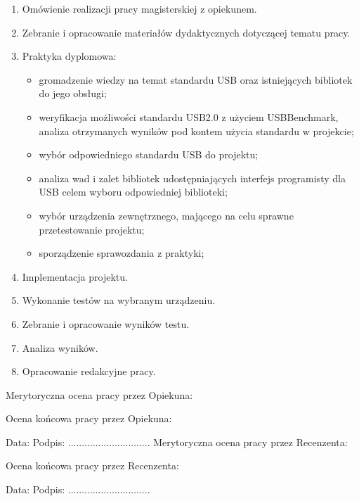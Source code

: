 \documentclass{BscUS}
\newcommand\blankpage{%
    \null
    \thispagestyle{empty}%
    \newpage}
\begin{document}
\begin{enumerate}
\item Omówienie realizacji pracy magisterskiej z opiekunem.
\item Zebranie i opracowanie materiałów dydaktycznych dotyczącej tematu pracy.
\item Praktyka dyplomowa:
\begin{itemize}
\item gromadzenie wiedzy na temat standardu USB oraz istniejących bibliotek do jego obsługi;
\item weryfikacja możliwości standardu USB2.0 z użyciem USBBenchmark, analiza otrzymanych wyników pod kontem użycia standardu w projekcie;
\item wybór odpowiedniego standardu USB do projektu;
\item analiza wad i zalet bibliotek udostępniających interfejs programisty dla USB celem wyboru odpowiedniej biblioteki;
\item wybór urządzenia zewnętrznego, mającego na celu sprawne przetestowanie projektu;
\item sporządzenie sprawozdania z praktyki;
\end{itemize}
\item Implementacja projektu.
\item Wykonanie testów na wybranym urządzeniu.
\item Zebranie i opracowanie wyników testu.
\item Analiza wyników.
\item Opracowanie redakcyjne pracy.
\end{enumerate}
\afterpage{\blankpage}
\newpage
\thispagestyle{plain}
Merytoryczna ocena pracy przez Opiekuna:


Ocena końcowa pracy przez Opiekuna: 

\hspace{2cm} Data: \hspace{6cm}  Podpis: ..............................
\afterpage{\blankpage}
\newpage
\thispagestyle{plain}
Merytoryczna ocena pracy przez Recenzenta:


Ocena końcowa pracy przez Recenzenta: 

\hspace{2cm} Data: \hspace{6cm}  Podpis: ..............................
\pagebreak
\newpage
\thispagestyle{plain}
\renewcommand*{\lstlistlistingname }{Spis elementów implementacji}
\end{document}
